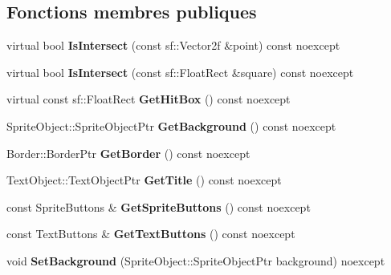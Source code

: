 \subsection*{Fonctions membres publiques}
\begin{DoxyCompactItemize}
\item 
\mbox{\label{classmy_1_1Panel_aeb4c2641fffa7463155b0f02a569605e}} 
virtual bool {\bfseries Is\+Intersect} (const sf\+::\+Vector2f \&point) const noexcept
\item 
\mbox{\label{classmy_1_1Panel_a4550d5dbb1372c550d8b8a04d93d8957}} 
virtual bool {\bfseries Is\+Intersect} (const sf\+::\+Float\+Rect \&square) const noexcept
\item 
\mbox{\label{classmy_1_1Panel_a38b845449682c439accb6b43c8cbb11c}} 
virtual const sf\+::\+Float\+Rect {\bfseries Get\+Hit\+Box} () const noexcept
\item 
\mbox{\label{classmy_1_1Panel_a12e5e481395820c64aaa4cb3858638ad}} 
Sprite\+Object\+::\+Sprite\+Object\+Ptr {\bfseries Get\+Background} () const noexcept
\item 
\mbox{\label{classmy_1_1Panel_a145142192e283b5581485a81de5ec009}} 
Border\+::\+Border\+Ptr {\bfseries Get\+Border} () const noexcept
\item 
\mbox{\label{classmy_1_1Panel_a4e76064b1f66de5ac2a671f8b6d6c608}} 
Text\+Object\+::\+Text\+Object\+Ptr {\bfseries Get\+Title} () const noexcept
\item 
\mbox{\label{classmy_1_1Panel_abc0b2f1bd63e3f924e02f6795c7d219d}} 
const Sprite\+Buttons \& {\bfseries Get\+Sprite\+Buttons} () const noexcept
\item 
\mbox{\label{classmy_1_1Panel_a7ebb1743164a0538c2debcb48553b185}} 
const Text\+Buttons \& {\bfseries Get\+Text\+Buttons} () const noexcept
\item 
\mbox{\label{classmy_1_1Panel_a6bc042f2ac2d4b4556815eeac005610e}} 
void {\bfseries Set\+Background} (Sprite\+Object\+::\+Sprite\+Object\+Ptr background) noexcept
\item 

\end{DoxyCompactItemize}
